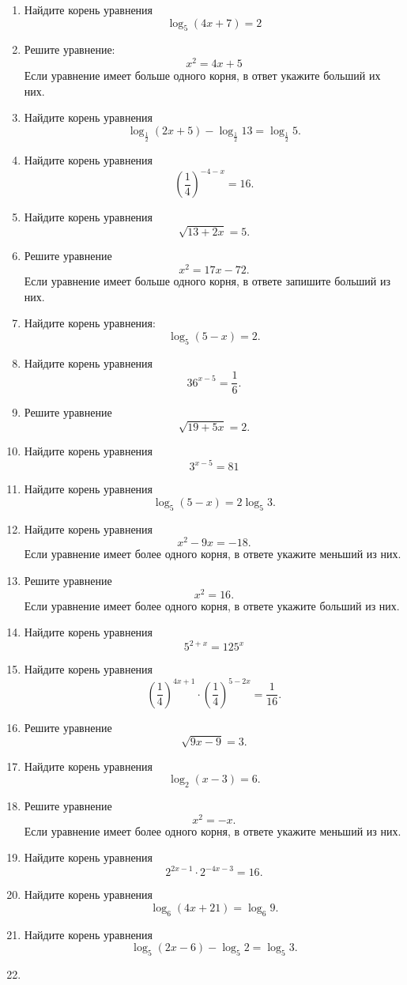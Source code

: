 \begin{enumerate}
  Найдите корень уравнения: \[3^{8 - x} = 27.\]
\item
  Найдите корень уравнения \[\log_{5}(4x + 7) = 2\]
\item
  Решите уравнение: \[x^2=4x+5\] Если уравнение имеет больше одного
  корня, в ответ укажите больший их них.
\item
  Найдите корень уравнения
  \[\log_{\frac{1}{2}}(2x + 5) - \log_{\frac{1}{2}}13 = \log_{\frac{1}{2}}5.\]
\item
  Найдите корень уравнения \[\left(\frac{1}{4}\right)^{-4 - x} = 16.\]
\item
  Найдите корень уравнения \[\sqrt{13 + 2x} = 5.\]
\item
  Решите уравнение \[x^2 = 17x - 72.\] Если уравнение имеет больше
  одного корня, в ответе запишите больший из них.
\item
  Найдите корень уравнения: \[\log_{5}(5 - x) = 2.\]
\item
  Найдите корень уравнения \[36^{x - 5} = \frac{1}{6}.\]
\item
  Решите уравнение \[\sqrt{19 + 5x} = 2.\]
\item
  Найдите корень уравнения \[3^{x - 5} = 81\]
\item
  Найдите корень уравнения \[\log_{5}(5 - x) = 2\log_{5}3.\]
\item
  Найдите корень уравнения \[x^2 - 9x = -18.\] Если уравнение имеет
  более одного корня, в ответе укажите меньший из них.
\item
  Решите уравнение \[x^2 = 16.\] Если уравнение имеет более одного
  корня, в ответе укажите больший из них.
\item
  Найдите корень уравнения \[5^{2 + x} = 125^{x}\]
\item
  Найдите корень уравнения
  \[\left(\frac{1}{4}\right)^{4x + 1} \cdot \left(\frac{1}{4}\right)^{5 - 2x} = \frac{1}{16}.\]
\item
  Решите уравнение \[\sqrt{9x - 9} = 3.\]
\item
  Найдите корень уравнения \[\log_{2}(x - 3) = 6.\]
\item
  Решите уравнение \[x^2 = -x.\] Если уравнение имеет более одного
  корня, в ответе укажите меньший из них.
\item
  Найдите корень уравнения \[2^{2x - 1} \cdot 2^{-4x - 3} = 16.\]
\item
  Найдите корень уравнения \[\log_{6}(4x + 21) = \log_{6}9.\]
\item
  Найдите корень уравнения \[\log_{5}(2x - 6) - \log_{5}2 = \log_{5}3.\]
\item

\end{enumerate}
